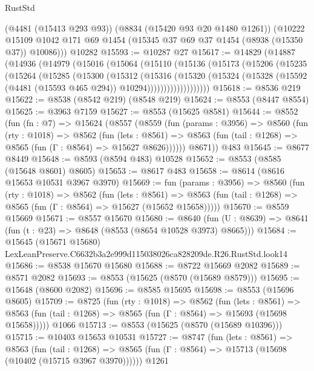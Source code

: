 \begin{lexlean}{RustStd}
\begin{coremodule}
      (@4481 (@15413 @293 @93))
      (@8834 (@15420 @93 @20 @1480 @1261))
      (@10222 @15109 @1042 @171 @69 @1454 (@15345 @37 @69 @37 @1454 (@8938 (@15350 @37)) @10086)))
    @10282
@15593 := @10287 @27
@15617 := @14829
    (@14887
      (@14936
        (@14979
          (@15016
            (@15064
              (@15110
                (@15136
                  (@15173
                    (@15206
                      (@15235
                        (@15264
                          (@15285
                            (@15300
                              (@15312
                                (@15316
                                  (@15320
                                    (@15324
                                      (@15328
                                        (@15592 (@4481 (@15593 @465 @294)) @10294)))))))))))))))))))
@15618 := @8536 @219
@15622 := @8538 (@8542 @219) (@8548 @219)
@15624 := @8553 (@8447 @8554)
@15625 := @3963 @7159
@15627 := @8553 (@15625 @8581)
@15644 := @8552
    (fun (fn : @7) =>
    @15624
      (@8557
        (@8559
          (fun (params : @3956) =>
          @8560
            (fun (rty : @1018) =>
            @8562
              (fun (lets : @8561) =>
              @8563 (fun (tail : @1268) => @8565 (fun (Γ : @8564) => @15627 @8626))))))
        @8671))
    @483
@15645 := @8677 @8449
@15648 := @8593 (@8594 @483) @10528
@15652 := @8553 (@8585 (@15648 @8601) @8605)
@15653 := @8617 @483
@15658 := @8614 (@8616 @15653 @10531 @3967 @3970)
@15669 := fun (params : @3956) =>
  @8560
    (fun (rty : @1018) =>
    @8562
      (fun (lets : @8561) =>
      @8563 (fun (tail : @1268) => @8565 (fun (Γ : @8564) => @15627 (@15652 @15658)))))
@15670 := @8559 @15669
@15671 := @8557 @15670
@15680 := @8640
    (fun (U : @8639) => @8641 (fun (t : @23) => @8648 (@8553 (@8654 @10528 @3973) @8665)))
@15684 := @15645
    (@15671 @15680)
    LexLeanPreserve.C6632b3a2e999d115038026ca828209de.R26.RustStd.look14
@15686 := @8538 @15670 @15680
@15688 := @8722 @15669 @2082
@15689 := @8571 @2082
@15693 := @8553 (@15625 (@8570 (@15689 @8579)))
@15695 := @15648 (@8600 @2082)
@15696 := @8585 @15695
@15698 := @8553 (@15696 @8605)
@15709 := @8725
    (fun (rty : @1018) =>
    @8562
      (fun (lets : @8561) =>
      @8563 (fun (tail : @1268) => @8565 (fun (Γ : @8564) => @15693 (@15698 @15658)))))
    @1066
@15713 := @8553 (@15625 (@8570 (@15689 @10396)))
@15715 := @10403 @15653 @10531
@15727 := @8747
    (fun (lets : @8561) =>
    @8563
      (fun (tail : @1268) =>
      @8565 (fun (Γ : @8564) => @15713 (@15698 (@10402 (@15715 @3967 @3970))))))
    @1261

\end{coremodule}
\end{lexlean}
